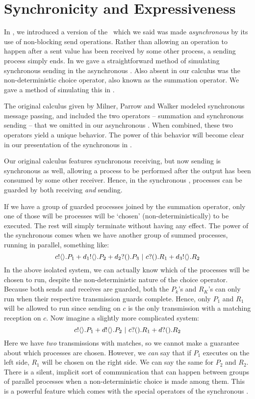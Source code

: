 \chapter{Synchronicity and Expressiveness}\label{sync_and_express}
In , we introduced a version of the \picalc\ which we said was made \emph{asynchronous} by its use of non-blocking send operations.  
Rather than allowing an operation to happen after a sent value has been received by some other process, a sending process simply ends.  
In  we gave a straightforward method of simulating synchronous sending in the asynchronous \picalc.  
Also absent in our calculus was the non-deterministic choice operator, also known as the summation operator.  
We gave a method of simulating this in .

The original calculus given by Milner, Parrow and Walker modeled synchronous message passing, and included the two operators -- summation and synchronous sending -- that we omitted in our asynchronous \picalc.  
When combined, these two operators yield a unique behavior.  
The power of this behavior will become clear in our presentation of the synchronous \picalc in .

Our original calculus features synchronous receiving, but now sending is synchronous as well, allowing a process to be performed after the output has been consumed by some other receiver.  
Hence, in the synchronous \picalc, processes can be guarded by both receiving \emph{and} sending.  


If we have a group of guarded processes joined by the summation operator, only one of those will be processes will be `chosen' (non-deterministically) to be executed.  
The rest will simply terminate without having any effect.  
The power of the synchronous \picalc comes when we have another group of summed processes, running in parallel, something like: 
\[
	{c}!\langle{}\rangle.P_1 + {d_1}!\langle{}\rangle.P_2 + {d_2}?({}).P_3 \ |\  {c}?({}).R_1 + {d_3}!\langle{}\rangle.R_2
\]
In the above isolated system, we can actually know which of the processes will be chosen to run, despite the non-deterministic nature of the choice operator.  
Because both sends and receives are guarded, both the $P_k$'s and $R_K$'s can only run when their respective transmission guards complete.  
Hence, only $P_1$ and $R_1$ will be allowed to run since sending on $c$ is the only transmission with a matching reception on $c$.  
Now imagine a slightly more complicated system:
\[
	{c}!\langle{}\rangle.P_1 + {d}!\langle{}\rangle.P_2 \ |\  {c}?({}).R_1 + {d}?({}).R_2
\]
Here we have \emph{two} transmissions with matches, so we cannot make a guarantee about which processes are chosen.  
However, we \emph{can} say that if $P_1$ executes on the left side, $R_1$ will be chosen on the right side.  
We can say the same for $P_2$ and $R_2$.  
There is a silent, implicit sort of communication that can happen between groups of parallel processes when a non-deterministic choice is made among them.  
This is a powerful feature which comes with the special operators of the synchronous \picalc.

